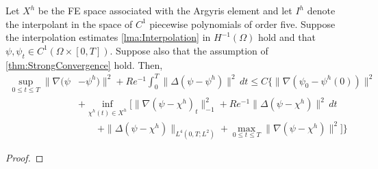 \begin{thm} \label{thm:SemiInterp}
  Let $X^h$ be the FE space associated with the Argyris element and let $I^h$
  denote the interpolant in the space of $C^1$ piecewise polynomials of order
  five. Suppose the interpolation estimates \autoref{lma:Interpolation}
  in $H^{-1}(\Omega)$ hold and that $\psi, \psi_t \in C^1(\Omega\times [0,T])$.
  Suppose also that the assumption of \autoref{thm:StrongConvergence} hold.
  Then,
  \begin{equation}
    \begin{split}
      \sup_{0\le t \le T} \|\nabla (\psi &- \psi^h) \|^2 + Re^{-1}
        \int_{0}^{T}\! \|\Delta (\psi - \psi^h)\|^2 \, dt \le C\biggl\{
          \|\nabla(\psi_0 - \psi^h(0))\|^2 \\
        & + \inf_{\chi^h(t) \in X^h} \biggl[\|\nabla(\psi - \chi^h)_t\|^2_{-1} +
          Re^{-1} \|\Delta(\psi - \chi^h)\|^2\, dt \\
        & \qquad + \|\Delta(\psi - \chi^h)\|_{L^4(0,T;L^2)} + \max_{0 \le t \le T}
          \|\nabla (\psi - \chi^h)\|^2\biggr] \biggr\}
    \end{split}
    \label{eqn:SemiInterp}
  \end{equation}
\end{thm}
\begin{proof}

\end{proof}
